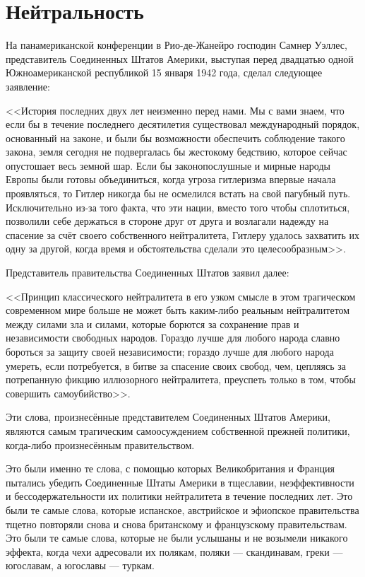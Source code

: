 \chapter{Нейтральность}

На панамериканской конференции в Рио-де-Жанейро господин Самнер Уэллес, представитель Соединенных Штатов Америки, выступая перед двадцатью одной Южноамериканской республикой 15 января 1942 года, сделал следующее заявление:
 
<<История последних двух лет неизменно перед нами. Мы с вами знаем, что если бы в течение последнего десятилетия существовал международный порядок, основанный на законе, и были бы возможности обеспечить соблюдение такого закона, земля сегодня не подвергалась бы жестокому бедствию, которое сейчас опустошает весь земной шар. Если бы законопослушные и мирные народы Европы были готовы объединиться, когда угроза гитлеризма впервые начала проявляться, то Гитлер никогда бы не осмелился встать на свой пагубный путь. Исключительно из-за того факта, что эти нации, вместо того чтобы сплотиться, позволили себе держаться в стороне друг от друга и возлагали надежду на спасение за счёт своего собственного нейтралитета, Гитлеру удалось захватить их одну за другой, когда время и обстоятельства сделали это целесообразным>>.

Представитель правительства Соединенных Штатов заявил далее:

<<Принцип классического нейтралитета в его узком смысле в этом трагическом современном мире больше не может быть каким-либо реальным нейтралитетом между силами зла и силами, которые борются за сохранение прав и независимости свободных народов. Гораздо лучше для любого народа славно бороться за защиту своей независимости; гораздо лучше для любого народа умереть, если потребуется, в битве за спасение своих свобод, чем, цепляясь за потрепанную фикцию иллюзорного нейтралитета, преуспеть только в том, чтобы совершить самоубийство>>.

Эти слова, произнесённые представителем Соединенных Штатов Америки, являются самым трагическим самоосуждением собственной прежней политики, когда-либо произнесённым правительством.

Это были именно те слова, с помощью которых Великобритания и Франция пытались убедить Соединенные Штаты Америки в тщеславии, неэффективности и бессодержательности их политики нейтралитета в течение последних лет. Это были те самые слова, которые испанское, австрийское и эфиопское правительства тщетно повторяли снова и снова британскому и французскому правительствам. Это были те самые слова, которые не были услышаны и не возымели никакого эффекта, когда чехи адресовали их полякам, поляки — скандинавам, греки — югославам, а югославы — туркам.

